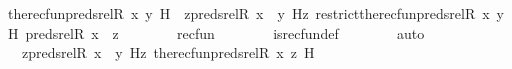 \begin{isabellebody}
\ {\isachardoublequoteopen}the{\isacharunderscore}{\kern0pt}recfun{\isacharparenleft}{\kern0pt}preds{\isacharunderscore}{\kern0pt}rel{\isacharparenleft}{\kern0pt}R{\isacharcomma}{\kern0pt}\ x{\isacharparenright}{\kern0pt}{\isacharcomma}{\kern0pt}\ y{\isacharcomma}{\kern0pt}\ H{\isacharparenright}{\kern0pt}\ {\isacharequal}{\kern0pt}\ {\isacharparenleft}{\kern0pt}{\isasymlambda}z{\isasymin}preds{\isacharunderscore}{\kern0pt}rel{\isacharparenleft}{\kern0pt}R{\isacharcomma}{\kern0pt}\ x{\isacharparenright}{\kern0pt}\ {\isacharminus}{\kern0pt}{\isacharbackquote}{\kern0pt}{\isacharbackquote}{\kern0pt}\ {\isacharbraceleft}{\kern0pt}y{\isacharbraceright}{\kern0pt}{\isachardot}{\kern0pt}\ H{\isacharparenleft}{\kern0pt}z{\isacharcomma}{\kern0pt}\ restrict{\isacharparenleft}{\kern0pt}the{\isacharunderscore}{\kern0pt}recfun{\isacharparenleft}{\kern0pt}preds{\isacharunderscore}{\kern0pt}rel{\isacharparenleft}{\kern0pt}R{\isacharcomma}{\kern0pt}\ x{\isacharparenright}{\kern0pt}{\isacharcomma}{\kern0pt}\ y{\isacharcomma}{\kern0pt}\ H{\isacharparenright}{\kern0pt}{\isacharcomma}{\kern0pt}\ preds{\isacharunderscore}{\kern0pt}rel{\isacharparenleft}{\kern0pt}R{\isacharcomma}{\kern0pt}\ x{\isacharparenright}{\kern0pt}\ {\isacharminus}{\kern0pt}{\isacharbackquote}{\kern0pt}{\isacharbackquote}{\kern0pt}\ {\isacharbraceleft}{\kern0pt}z{\isacharbraceright}{\kern0pt}{\isacharparenright}{\kern0pt}{\isacharparenright}{\kern0pt}{\isacharparenright}{\kern0pt}{\isachardoublequoteclose}\isanewline
\ \ \ \ \ \ \isamarkupfalse%
\ recfun\isanewline
\ \ \ \ \ \ \isamarkupfalse%
\ is{\isacharunderscore}{\kern0pt}recfun{\isacharunderscore}{\kern0pt}def\isanewline
\ \ \ \ \ \ \isamarkupfalse%
\ auto\isanewline
\ \ \ \ \isamarkupfalse%
\ \isamarkupfalse%
\ {\isachardoublequoteopen}{\isachardot}{\kern0pt}{\isachardot}{\kern0pt}{\isachardot}{\kern0pt}\ {\isacharequal}{\kern0pt}\ {\isacharparenleft}{\kern0pt}{\isasymlambda}z{\isasymin}preds{\isacharunderscore}{\kern0pt}rel{\isacharparenleft}{\kern0pt}R{\isacharcomma}{\kern0pt}\ x{\isacharparenright}{\kern0pt}\ {\isacharminus}{\kern0pt}{\isacharbackquote}{\kern0pt}{\isacharbackquote}{\kern0pt}\ {\isacharbraceleft}{\kern0pt}y{\isacharbraceright}{\kern0pt}{\isachardot}{\kern0pt}\ H{\isacharparenleft}{\kern0pt}z{\isacharcomma}{\kern0pt}\ the{\isacharunderscore}{\kern0pt}recfun{\isacharparenleft}{\kern0pt}preds{\isacharunderscore}{\kern0pt}rel{\isacharparenleft}{\kern0pt}R{\isacharcomma}{\kern0pt}\ x{\isacharparenright}{\kern0pt}{\isacharcomma}{\kern0pt}\ z{\isacharcomma}{\kern0pt}\ H{\isacharparenright}{\kern0pt}{\isacharparenright}{\kern0pt}{\isacharparenright}{\kern0pt}{\isachardoublequoteclose}\isanewline

\end{isabellebody}
